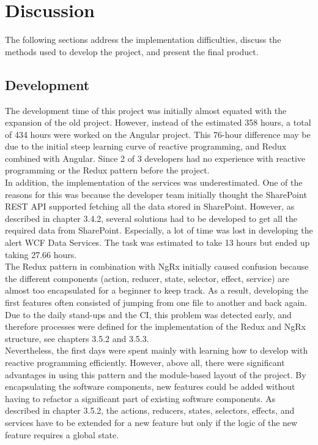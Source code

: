 \documentclass[Bachelor,BIF,english]{twbook}
\begin{document}
\clearpage


\chapter{Discussion}
The following sections address the implementation difficulties, discuss the methods used to develop the project, and present the final product.

\section{Development}
The development time of this project was initially almost equated with the expansion of the old project. However, instead of the estimated 358 hours, a total of 434 hours were worked on the Angular project. This 76-hour difference may be due to the initial steep learning curve of reactive programming, and Redux combined with Angular. Since 2 of 3 developers had no experience with reactive programming or the Redux pattern before the project.
\\[\baselineskip]
In addition, the implementation of the services was underestimated. One of the reasons for this was because the developer team initially thought the SharePoint REST API supported fetching all the data stored in SharePoint. However, as described in chapter 3.4.2, several solutions had to be developed to get all the required data from SharePoint. Especially, a lot of time was lost in developing the alert WCF Data Services. The task was estimated to take 13 hours but ended up taking 27.66 hours.
\\[\baselineskip]
The Redux pattern in combination with NgRx initially caused confusion because the different components (action, reducer, state, selector, effect, service) are almost too encapsulated for a beginner to keep track. As a result, developing the first features often consisted of jumping from one file to another and back again. Due to the daily stand-ups and the CI, this problem was detected early, and therefore processes were defined for the implementation of the Redux and NgRx structure, see chapters 3.5.2 and 3.5.3.
\\[\baselineskip]
Nevertheless, the first days were spent mainly with learning how to develop with reactive programming efficiently. However, above all, there were significant advantages in using this pattern and the module-based layout of the project. By encapsulating the software components, new features could be added without having to refactor a significant part of existing software components. As described in chapter 3.5.2, the actions, reducers, states, selectors, effects, and services have to be extended for a new feature but only if the logic of the new feature requires a global state.
\end{document}
